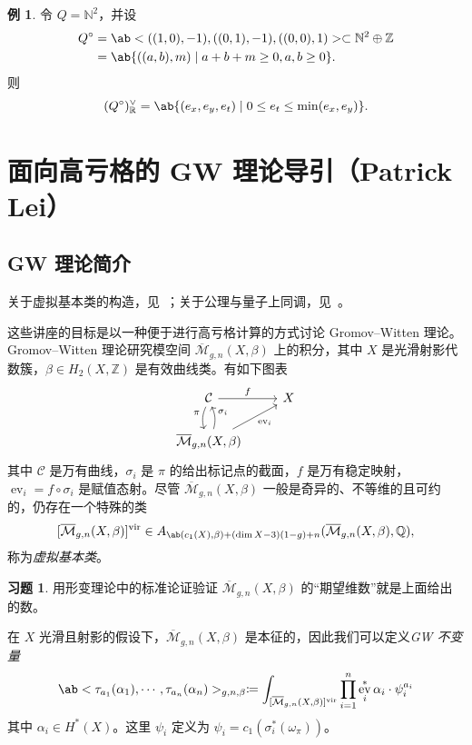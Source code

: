 \documentclass{amsart}
\theoremstyle{definition}
\newtheorem{exm}[thm]{例}
\newtheorem{exer}[thm]{习题}
\theoremstyle{remark}
\theoremstyle{plain}
\theoremstyle{definition}
\theoremstyle{remark}
\newcommand{\N}{\mathbb{N}}
\newcommand{\R}{\mathbb{R}}
\newcommand{\Z}{\mathbb{Z}}
\newcommand{\Q}{\mathbb{Q}}
\newcommand{\Mbar}{\overline{\mathcal{M}}}
\newcommand{\mc}[1]{\mathcal{#1}}
\newcommand{\mr}[1]{\mathrm{#1}}
\newcommand{\on}[1]{\operatorname{#1}}
\newcommand{\1}{\mathbf{1}}
\newcommand{\2}{\mathbf{2}}
\newcommand{\3}{\mathbf{3}}
\newcommand{\vir}{\mr{vir}}
\DeclareMathOperator{\ev}{ev}
\begin{document}
\begin{exm}
    令 \(Q = \N^2\)，并设
    \begin{align*}
        Q^{\circ} &= \ab<((1,0), -1), ((0,1), -1), ((0,0),1)> \subset \N^2 \oplus \Z \\
        &= \ab\{((a,b), m) \mid a+b+m \geq 0, a,b \geq 0 \}.
    \end{align*}
    则
    \[ (Q^{\circ})_{\R}^{\vee} = \ab\{ (e_x, e_y, e_t) \mid 0 \leq e_t \leq \min(e_x, e_y) \}. \]
\end{exm}
\section{面向高亏格的 GW 理论导引（Patrick Lei）}%
\label{sec:Intro to GW theory with a view to higher genus (Patrick Lei)}


\subsection{GW 理论简介}%
\label{sub:Introduction to GW theory}

关于虚拟基本类的构造，见~\cite{BehrendFantechi1997}；关于公理与量子上同调，见~\cite{KM1994}。

这些讲座的目标是以一种便于进行高亏格计算的方式讨论 Gromov--Witten 理论。Gromov--Witten 理论研究模空间 \(\Mbar_{g,n}(X, \beta)\) 上的积分，其中 \(X\) 是光滑射影代数簇，\(\beta \in H_2(X, \Z)\) 是有效曲线类。有如下图表
\begin{equation*}
\begin{tikzcd}
    \mc{C} \ar{r}{f} \ar[bend right=20]{d}[swap]{\pi} & X \\
    \Mbar_{g,n}(X, \beta) \ar[bend right=20]{u}[swap]{\sigma_i} \ar{ur}[swap]{\on{ev}_i}
\end{tikzcd}
\end{equation*}
其中 \(\mc{C}\) 是万有曲线，\(\sigma_i\) 是 \(\pi\) 的给出标记点的截面，\(f\) 是万有稳定映射，\(\ev_i = f \circ \sigma_i\) 是赋值态射。尽管 \(\Mbar_{g,n}(X, \beta)\) 一般是奇异的、不等维的且可约的，仍存在一个特殊的类
\[ [\Mbar_{g,n}(X, \beta)]^{\vir} \in A_{\ab(c_1(X), \beta) + (\dim X - 3)(1-g) + n}(\Mbar_{g,n}(X, \beta), \Q), \]
称为\textit{虚拟基本类}。

\begin{exer}
    用形变理论中的标准论证验证 \(\Mbar_{g,n}(X, \beta)\) 的``期望维数''就是上面给出的数。
\end{exer}

在 \(X\) 光滑且射影的假设下，\(\Mbar_{g,n}(X, \beta)\) 是本征的，因此我们可以定义\textit{GW 不变量}
\[ \ab<\tau_{a_1}(\alpha_1), \cdots, \tau_{a_n}(\alpha_n)>_{g,n,\beta} \coloneqq \int_{[\Mbar_{g,n}(X, \beta)]^{\vir}} \prod_{i=1}^n \ev_i^* \alpha_i \cdot \psi_i^{a_i} \]
其中 \(\alpha_i \in H^*(X)\)。这里 \(\psi_i\) 定义为 \(\psi_i = c_1(\sigma_i^*(\omega_{\pi}))\)。
\end{document}
